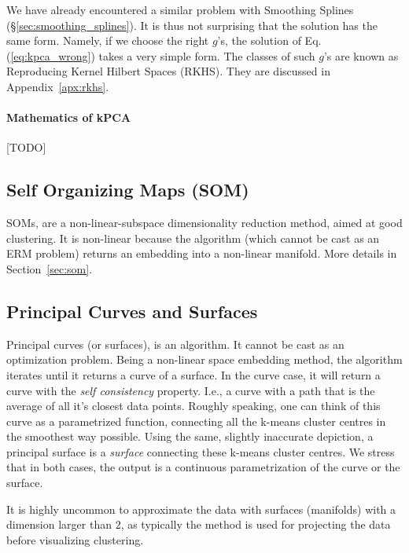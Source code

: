 \documentclass[12pt,a4paper]{article}
\begin{document}
We have already encountered a similar problem with Smoothing Splines (\S\ref{sec:smoothing_splines}). It is thus not surprising that the solution has the same form. 
Namely, if we choose the right $g$'s, the solution of Eq.(\ref{eq:kpca_wrong}) takes a very simple form. 
The classes of such $g$'s are known as Reproducing Kernel Hilbert Spaces (RKHS). 
They are discussed in Appendix~\ref{apx:rkhs}.



\paragraph{Mathematics of kPCA}
[TODO]




\subsection{Self Organizing Maps (SOM)}
SOMs, are a non-linear-subspace dimensionality reduction method, aimed at good clustering. 
It is non-linear because the algorithm (which cannot be cast as an ERM problem) returns an embedding into a non-linear manifold.
More details in Section~\ref{sec:som}.



\subsection{Principal Curves and Surfaces}


Principal curves (or surfaces), is an algorithm. It cannot be cast as an optimization problem.
Being a non-linear space embedding method, the algorithm iterates until it returns a curve of a surface.
In the curve case, it will return a curve with the \emph{self consistency} property. I.e., a curve with a path that is the average of all it's closest data points.
Roughly speaking, one can think of this curve as a parametrized function, connecting all the k-means cluster centres in the smoothest way possible.
Using the same, slightly inaccurate depiction, a principal surface is a \emph{surface} connecting these k-means cluster centres.
We stress that in both cases, the output is a continuous parametrization of the curve or the surface.

It is highly uncommon to approximate the data with surfaces (manifolds) with a dimension larger than $2$, as typically the method is used for projecting the data before visualizing \andor clustering.
\end{document}
